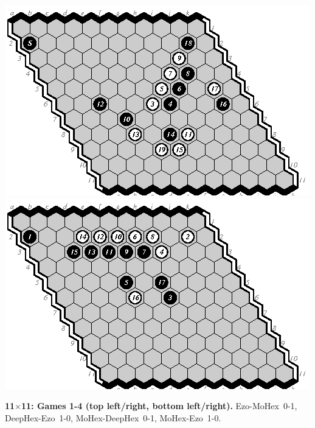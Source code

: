 \documentclass{icga}
\def\Dx{\mbox{\sc DeepHex}}
\def\Eo{\mbox{\sc Ezo}}
\def\Mx{\mbox{\sc MoHex}}
\begin{document}
\includegraphics[scale=1.3]{3m-d.eps}\hspace*{-1cm}\includegraphics[scale=1.3]{4m-e.eps}

{\bf 11$\times$11: Games 1-4 (top left/right, bottom left/right).}
\Eo-\Mx\ 0-1, \Dx-\Eo\ 1-0, \Mx-\Dx\ 0-1, \Mx-\Eo\ 1-0.
\end{document}
